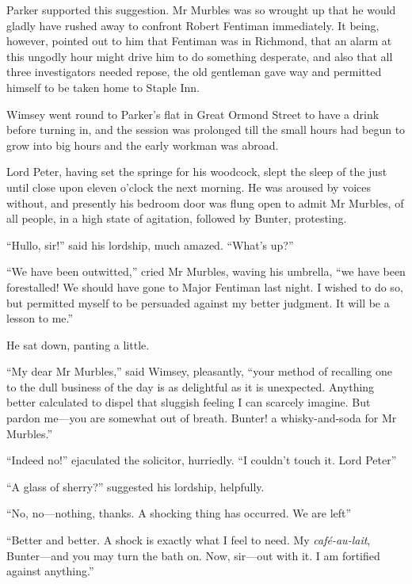 Parker supported this suggestion. Mr Murbles was so wrought up that he would gladly have rushed away to confront Robert Fentiman immediately. It being, however, pointed out to him that Fentiman was in Richmond, that an alarm at this ungodly hour might drive him to do something desperate, and also that all three investigators needed repose, the old gentleman gave way and permitted himself to be taken home to Staple Inn.

Wimsey went round to Parker's flat in Great Ormond Street to have a drink before turning in, and the session was prolonged till the small hours had begun to grow into big hours and the early workman was abroad.

Lord Peter, having set the springe for his woodcock, slept the sleep of the just until close upon eleven o'clock the next morning. He was aroused by voices without, and presently his bedroom door was flung open to admit Mr Murbles, of all people, in a high state of agitation, followed by Bunter, protesting.

\enquote{Hullo, sir!} said his lordship, much amazed. \enquote{What's up?}

\enquote{We have been outwitted,} cried Mr Murbles, waving his umbrella, \enquote{we have been forestalled! We should have gone to Major Fentiman last night. I wished to do so, but permitted myself to be persuaded against my better judgment. It will be a lesson to me.}

He sat down, panting a little.

\enquote{My dear Mr Murbles,} said Wimsey, pleasantly, \enquote{your method of recalling one to the dull business of the day is as delightful as it is unexpected. Anything better calculated to dispel that sluggish feeling I can scarcely imagine. But pardon me\allowbreak---\allowbreak you are somewhat out of breath. Bunter! a whisky-and-soda for Mr Murbles.}

\enquote{Indeed no!} ejaculated the solicitor, hurriedly. \enquote{I couldn't touch it. Lord Peter\longdash}

\enquote{A glass of sherry?} suggested his lordship, helpfully.

\enquote{No, no\allowbreak---\allowbreak nothing, thanks. A shocking thing has occurred. We are left\longdash}

\enquote{Better and better. A shock is exactly what I feel to need. My \textit{café-au-lait}, Bunter\allowbreak---\allowbreak and you may turn the bath on. Now, sir\allowbreak---\allowbreak out with it. I am fortified against anything.}

